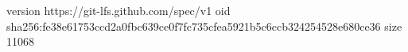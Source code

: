 version https://git-lfs.github.com/spec/v1
oid sha256:fe38e61753ccd2a0fbc639ce0f7fc735cfea5921b5c6ccb324254528e680ce36
size 11068
